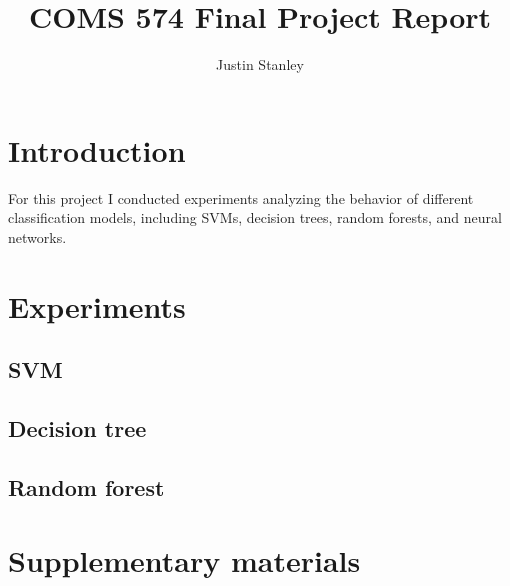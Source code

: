 \documentclass{article}
\begin{document}
\title{COMS 574 Final Project Report}
\author{Justin Stanley}

\maketitle

\section{Introduction}

For this project I conducted experiments analyzing the behavior of different classification models, including SVMs, decision trees, random forests, and neural networks.

\section{Experiments}

\subsection{SVM}
\subsection{Decision tree}
\subsection{Random forest}

\section{Supplementary materials}
\end{document}
